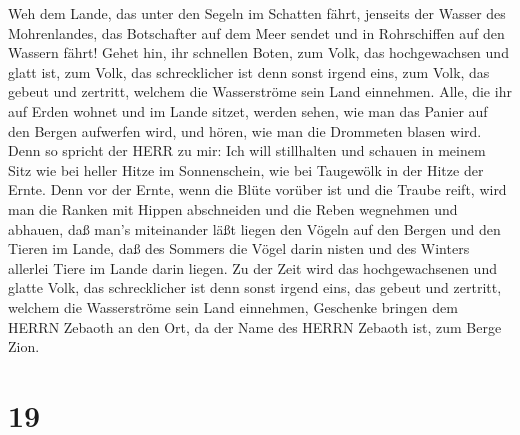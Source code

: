  Weh dem Lande, das unter den Segeln im Schatten fährt,
jenseits der Wasser des Mohrenlandes,  das Botschafter auf
dem Meer sendet und in Rohrschiffen auf den Wassern fährt! Gehet hin,
ihr schnellen Boten, zum Volk, das hochgewachsen und glatt ist, zum
Volk, das schrecklicher ist denn sonst irgend eins, zum Volk, das gebeut
und zertritt, welchem die Wasserströme sein Land einnehmen. 
Alle, die ihr auf Erden wohnet und im Lande sitzet, werden sehen, wie
man das Panier auf den Bergen aufwerfen wird, und hören, wie man die
Drommeten blasen wird.  Denn so spricht der HERR zu mir: Ich
will stillhalten und schauen in meinem Sitz wie bei heller Hitze im
Sonnenschein, wie bei Taugewölk in der Hitze der Ernte. 
Denn vor der Ernte, wenn die Blüte vorüber ist und die Traube reift,
wird man die Ranken mit Hippen abschneiden und die Reben wegnehmen und
abhauen,  daß man's miteinander läßt liegen den Vögeln auf
den Bergen und den Tieren im Lande, daß des Sommers die Vögel darin
nisten und des Winters allerlei Tiere im Lande darin liegen.
 Zu der Zeit wird das hochgewachsenen und glatte Volk, das
schrecklicher ist denn sonst irgend eins, das gebeut und zertritt,
welchem die Wasserströme sein Land einnehmen, Geschenke bringen dem
HERRN Zebaoth an den Ort, da der Name des HERRN Zebaoth ist, zum Berge
Zion.

\hypertarget{section-18}{%
\section{19}\label{section-18}}

